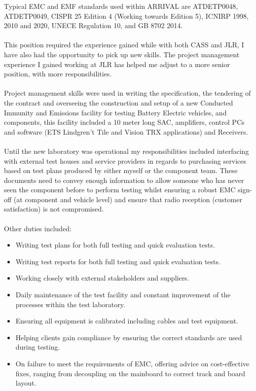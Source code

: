 {{{Typical EMC and EMF standards used within ARRIVAL are ATDETP0048, ATDETP0049, CISPR 25 Edition 4 (Working towards Edition 5), ICNIRP 1998, 2010 and 2020, UNECE Regulation 10, and GB 8702 2014.
\\
\\
This position required the experience gained while with both CASS and JLR, I have also had the opportunity to pick up new skills.
The project management experience I gained working at JLR has helped me adjust to a more senior position, with more responsibilities.
\\
\\
Project management skills were used in writing the specification, the tendering of the contract and overseeing the construction and setup of a new Conducted Immunity and Emissions facility for testing Battery Electric vehicles, and components, this facility included a 10 meter long SAC, amplifiers, control PCs and software (ETS Lindgren’t Tile and Vision TRX applications) and Receivers.
\\
\\
Until the new laboratory was operational my responsibilities included interfacing with external test houses and service providers in regards to purchasing services based on test plans produced by either myself or the component team. These documents need to convey enough information to allow someone who has never seen the component before to perform testing whilst ensuring a robust EMC sign-off (at component and vehicle level) and ensure that radio reception (customer satisfaction) is not compromised. 
\\
\\
Other duties included:
	\begin{itemize}
	    \item Writing test plans for both full testing and quick evaluation tests.
	    \item Writing test reports for both full testing and quick evaluation tests.
	    \item Working closely with external stakeholders and suppliers.
	    \item Daily maintenance of the test facility and constant improvement of the processes within the test laboratory.
	    \item Ensuring all equipment is calibrated including cables and test equipment.
	    \item Helping clients gain compliance by ensuring the correct standards are used during testing.
	    \item On failure to meet the requirements of EMC, offering advice on cost-effective fixes, ranging from decoupling on the mainboard to correct track and board layout.

\end{itemize}}}}
